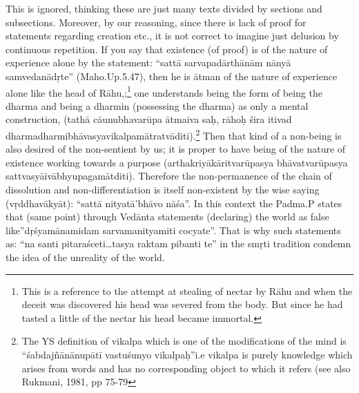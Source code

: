 This is ignored, thinking these are just many texts divided by sections and subsections.  Moreover, by our reasoning, since there is lack of proof for statements regarding creation etc., it is not correct to imagine just delusion by continuous repetition. If you say that existence (of proof) is of the nature of experience alone by the statement: “sattā sarvapadārthānām nānyā samvedanādṛte” (Maho.Up.5.47), then he is ātman of the nature of experience alone like the head of Rāhu,;\footnote{This is a reference to the attempt at stealing of nectar by Rāhu and when the deceit was discovered his head was severed from the body. But since he had tasted a little of the nectar his head became immortal.} one understands being the form of being the dharma and being a dharmin (possessing the dharma) as only a mental construction, (tathā cāunubhavarūpa ātmaiva saḥ, rāhoḥ śira itivad dharmadharmibhāvasya\break vikalpamātratvāditi).\footnote{The YS definition of vikalpa which is one of the modifications of the mind is “śabdajñānānupātī vastuśunyo vikalpaḥ”i.e vikalpa is purely knowledge which arises from words and has no corresponding object to which it refers (see also Rukmani, 1981, pp 75-79} Then that kind of a non-being is also desired of the non-sentient by us; it is proper to have being of the nature of existence working towards a purpose (arthakriyākāritvarūpasya bhāvatvarūpasya sattvasyāivābhyupagamātditi). Therefore the non-perma\-nence of the chain of dissolution and non-differentiation is itself non-existent by the wise saying (vṛddhavākyāt): “sattā nityatā’bhāvo nāśa”. In this context the Padma.P states that (same point) through Vedānta statements (declaring) the world as false like”dṛśyamānamidam sarvamanityamiti cocyate”. That is why such statements as: “na santi pitaraśceti…tasya raktam pibanti te” in the smṛti tradition condemn the idea of the unreality of the world.


